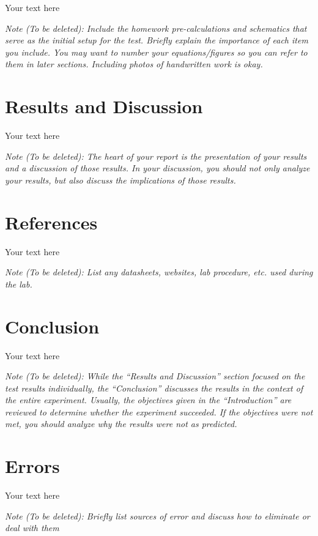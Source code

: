 \documentclass[10pt]{article}
\begin{document}
	Your text here
	
	\medskip
	
	\textit{Note (To be deleted): Include the homework pre-calculations and schematics that serve as the initial setup for the test. Briefly explain the importance of each item you include. You may want to number your equations/figures so you can refer to them in later sections. Including photos of handwritten work is okay.}
	
	\section{Results and Discussion}
	
	Your text here
	
	\medskip
	
	\textit{Note (To be deleted): The heart of your report is the presentation of your results and a discussion of those results. In your discussion, you should not only analyze your results, but also discuss the implications of those results.}
	
	\section{References}
	
	Your text here
	
	\medskip
	
	\textit{Note (To be deleted): List any datasheets, websites, lab procedure, etc. used during the lab.}
	
	\section{Conclusion}
	
	Your text here
	
	\medskip
	
	\textit{Note (To be deleted): While the ``Results and Discussion'' section focused on the test results individually, the ``Conclusion'' discusses the results in the context of the entire experiment. Usually, the objectives given in the ``Introduction'' are reviewed to determine whether the experiment succeeded. If the objectives were not met, you should analyze why the results were not as predicted.}
	
	\section{Errors}
	
	Your text here
	
	\medskip
	
	\textit{Note (To be deleted): Briefly list sources of error and discuss how to eliminate or deal with them}
	
\end{document}
